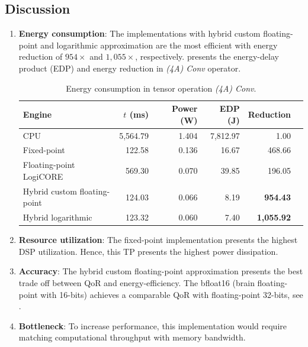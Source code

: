\subsection{Discussion}
\begin{enumerate}

	\item{\textbf{Energy consumption}}: The implementations with hybrid custom floating-point and logarithmic approximation are the most efficient with energy reduction of $954\times$ and $1,055\times$, respectively.  presents the energy-delay product (EDP) and energy reduction in \emph{(4A) Conv} operator.
	
\begin{table}[!htp]\centering
	\caption{Energy consumption in tensor operation \emph{(4A) Conv}.}\label{tab:edp}
	\scriptsize
	\begin{tabular}{lrrrrr}\toprule
		\textbf{Engine} & \textbf{$t$ (ms)} &\textbf{Power (W)} &\textbf{EDP (J)} &\textbf{Reduction} \\\midrule
		CPU &5,564.79 &1.404 &7,812.97 &1.00 \\
		Fixed-point &122.58 &0.136 &16.67 &468.66 \\
		Floating-point LogiCORE &569.30 &0.070 &39.85 &196.05 \\
		Hybrid custom floating-point &124.03 &0.066 &8.19 &\textbf{954.43} \\
		Hybrid logarithmic &123.32 &0.060 &7.40 &\textbf{1,055.92 }\\
		\bottomrule
	\end{tabular}
\end{table}
	
	\item{\textbf{Resource utilization}}: The fixed-point implementation presents the highest DSP utilization. Hence, this TP presents the highest power dissipation.
	
	\item{\textbf{Accuracy}}: The hybrid custom floating-point approximation presents the best trade off between QoR and energy-efficiency. The bfloat16 (brain floating-point with 16-bits) achieves a comparable QoR with floating-point 32-bits, see .
	
	\item{\textbf{Bottleneck}}: To increase performance, this implementation would require matching computational throughput with memory bandwidth.
\end{enumerate}